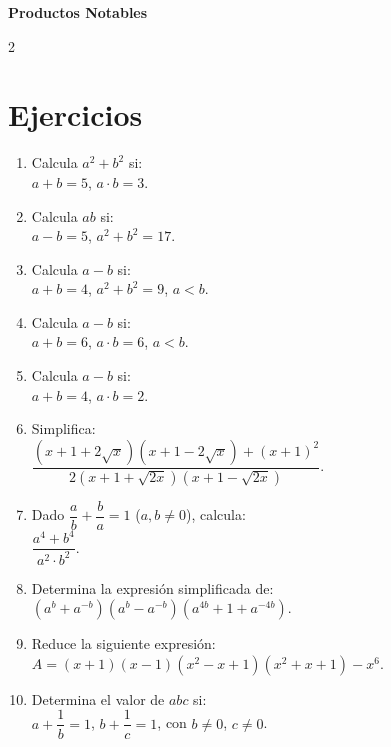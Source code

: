 \documentclass[10pt]{article}
\begin{document}
	\begin{center}
		\Large\bfseries Productos Notables
	\end{center}

\begin{multicols}{2}
	\section*{Ejercicios}
		\begin{enumerate}[label=\textbf{\arabic*.}, itemsep=0.4cm]
			\item Calcula $a^2 + b^2$ si: \\
			$a + b = 5$, $a \cdot b = 3$.

			\item Calcula $ab$ si: \\
			$a - b = 5$, $a^2 + b^2 = 17$.

			\item Calcula $a - b$ si: \\
			$a + b = 4$, $a^2 + b^2 = 9$, $a < b$.

			\item Calcula $a - b$ si: \\
			$a + b = 6$, $a \cdot b = 6$, $a < b$.

			\item Calcula $a - b$ si: \\
			$a + b = 4$, $a \cdot b = 2$.

			\item Simplifica: \\
			$\dfrac{(x + 1 + 2\sqrt{x})(x + 1 - 2\sqrt{x}) + (x + 1)^2}{2(x + 1 + \sqrt{2x})(x + 1 - \sqrt{2x})}$.

			\item Dado $\dfrac{a}{b} + \dfrac{b}{a} = 1$ ($a, b \neq 0$), calcula: \\
			$\dfrac{a^4 + b^4}{a^2 \cdot b^2}$.

			\item Determina la expresión simplificada de: \\
			$(a^b + a^{-b})(a^b - a^{-b})(a^{4b} + 1 + a^{-4b})$.

			\item Reduce la siguiente expresión: \\
			$A = (x + 1)(x - 1)(x^2 - x + 1)(x^2 + x + 1) - x^6$.

			\item Determina el valor de $abc$ si: \\
			$a + \dfrac{1}{b} = 1$, $b + \dfrac{1}{c} = 1$, con $b \neq 0$, $c \neq 0$.


\end{enumerate}
\end{multicols}
\end{document}
